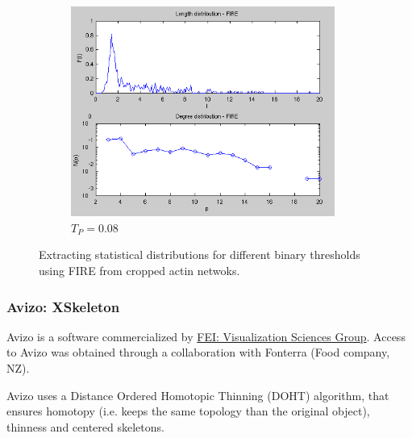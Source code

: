 \begin{figure}[H]
  \begin{subfigure}{0.5\textwidth}
    \includegraphics[width=0.95\textwidth]{Figures/chapter-image/fire/fire008histo.png}%
    \caption{$T_P=0.08$}
    \label{firehisto008}
  \end{subfigure}
\caption[Distributions of length and degree in FIRE]{Extracting statistical
distributions for different binary thresholds using FIRE from cropped
actin netwoks.}
\label{fig:fire_histograms}
\end{figure}


\subsubsection{Avizo: XSkeleton}
 Avizo is a software commercialized by
 \href{http://www.vsg3d.com/avizo/overview}{FEI: Visualization Sciences Group}.
Access to Avizo was obtained through a collaboration with Fonterra (Food company,
NZ).

Avizo uses a Distance Ordered Homotopic Thinning (DOHT) algorithm, that ensures homotopy (i.e. keeps the same topology than the original object),
thinness and centered skeletons.

